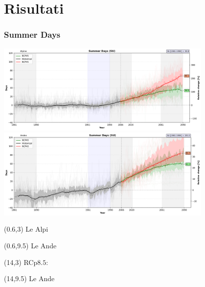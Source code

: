 \section{Risultati}
\setlength{\TPboxrulesize}{0pt}

\begin{frame}
\frametitle{Summer Days}
\begin{center}

{\includegraphics[width=0.8\textwidth]{risultati/su_Alpine_Models_ts_lim_120}} 
{\includegraphics[width=0.8\textwidth]{risultati/su_Andes_Models_ts_lim_120}}
\end{center}

{ \scriptsize
  \begin{textblock}{1.8}(0.6,3)
     {\color{gray} Le Alpi}
  \end{textblock}
}

{ \scriptsize
  \begin{textblock}{1.8}(0.6,9.5)
     {\color{gray} Le Ande}
  \end{textblock}
}


{ \scriptsize
  \begin{textblock}{1.8}(14,3)
     {\color{gray} RCp$8.5$: }
  \end{textblock}
}

{ \scriptsize
  \begin{textblock}{1.8}(14,9.5)
     {\color{gray} Le Ande}
  \end{textblock}
}




\end{frame}

